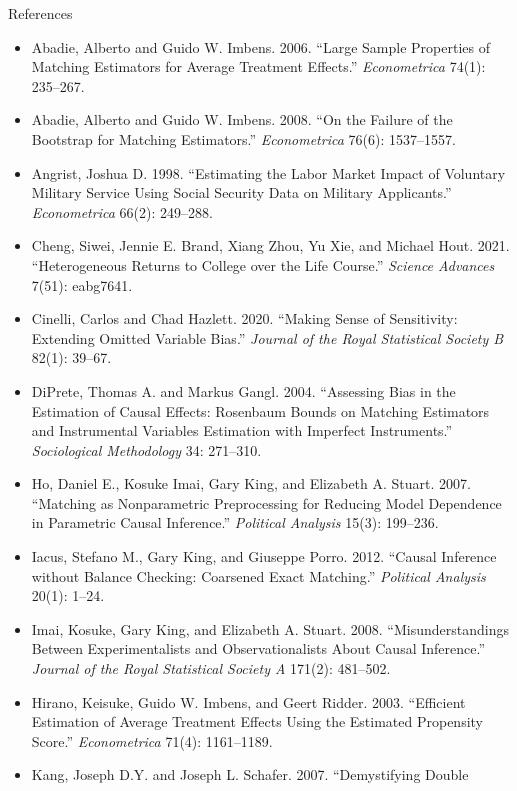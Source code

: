 \documentclass[aspectratio=169,11pt,xcolor=dvipsnames]{beamer}
\begin{document}
\begin{frame}[allowframebreaks,t]{References}
\footnotesize
\begin{itemize}\itemsep3pt
\item Abadie, Alberto and Guido W. Imbens. 2006. ``Large Sample Properties of
Matching Estimators for Average Treatment Effects.'' \textit{Econometrica}
74(1): 235--267.
\item Abadie, Alberto and Guido W. Imbens. 2008. ``On the Failure of the
Bootstrap for Matching Estimators.'' \textit{Econometrica} 76(6): 1537--1557.
\item Angrist, Joshua D. 1998. ``Estimating the Labor Market Impact of Voluntary
Military Service Using Social Security Data on Military Applicants.''
\textit{Econometrica} 66(2): 249--288.
\item Cheng, Siwei, Jennie E. Brand, Xiang Zhou, Yu Xie, and Michael Hout. 2021.
``Heterogeneous Returns to College over the Life Course.'' \textit{Science
Advances} 7(51): eabg7641.
\item Cinelli, Carlos and Chad Hazlett. 2020. ``Making Sense of Sensitivity:
Extending Omitted Variable Bias.'' \textit{Journal of the Royal Statistical
Society B} 82(1): 39--67.
\item DiPrete, Thomas A. and Markus Gangl. 2004. ``Assessing Bias in the
Estimation of Causal Effects: Rosenbaum Bounds on Matching Estimators and
Instrumental Variables Estimation with Imperfect Instruments.''
\textit{Sociological Methodology} 34: 271--310.
\item Ho, Daniel E., Kosuke Imai, Gary King, and Elizabeth A. Stuart. 2007.
``Matching as Nonparametric Preprocessing for Reducing Model Dependence in
Parametric Causal Inference.'' \textit{Political Analysis} 15(3): 199--236.
\item Iacus, Stefano M., Gary King, and Giuseppe Porro. 2012. ``Causal Inference
without Balance Checking: Coarsened Exact Matching.'' \textit{Political
Analysis} 20(1): 1--24.
\item Imai, Kosuke, Gary King, and Elizabeth A. Stuart. 2008. ``Misunderstandings
Between Experimentalists and Observationalists About Causal Inference.''
\textit{Journal of the Royal Statistical Society A} 171(2): 481--502.
\item Hirano, Keisuke, Guido W. Imbens, and Geert Ridder. 2003. ``Efficient
Estimation of Average Treatment Effects Using the Estimated Propensity Score.''
\textit{Econometrica} 71(4): 1161--1189.
\item Kang, Joseph D.Y. and Joseph L. Schafer. 2007. ``Demystifying Double

\end{itemize}
\end{frame}
\end{document}
